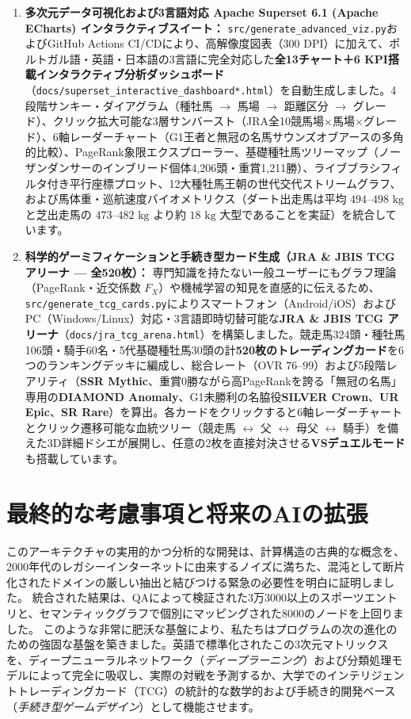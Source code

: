 \documentclass[12pt,a4paper]{article}
\begin{document}
\begin{enumerate}
    \item \textbf{多次元データ可視化および3言語対応 Apache Superset 6.1 (Apache ECharts) インタラクティブスイート：} \texttt{src/generate\_advanced\_viz.py}およびGitHub Actions CI/CDにより、高解像度図表（300 DPI）に加えて、ポルトガル語・英語・日本語の3言語に完全対応した\textbf{全13チャート＋6 KPI搭載インタラクティブ分析ダッシュボード}（\texttt{docs/superset\_interactive\_dashboard*.html}）を自動生成しました。4段階サンキー・ダイアグラム（種牡馬 $\to$ 馬場 $\to$ 距離区分 $\to$ グレード）、クリック拡大可能な3層サンバースト（JRA全10競馬場×馬場×グレード）、6軸レーダーチャート（G1王者と無冠の名馬サウンズオブアースの多角的比較）、PageRank象限エクスプローラー、基礎種牡馬ツリーマップ（ノーザンダンサーのインブリード個体4,206頭・重賞1,211勝）、ライブブラシフィルタ付き平行座標プロット、12大種牡馬王朝の世代交代ストリームグラフ、および馬体重・巡航速度バイオメトリクス（ダート出走馬は平均 $494\text{--}498\text{ kg}$ と芝出走馬の $473\text{--}482\text{ kg}$ より約 $18\text{ kg}$ 大型であることを実証）を統合しています。
    \item \textbf{科学的ゲーミフィケーションと手続き型カード生成（JRA \& JBIS TCG アリーナ — 全520枚）：} 専門知識を持たない一般ユーザーにもグラフ理論（PageRank・近交係数 $F_X$）や機械学習の知見を直感的に伝えるため、\texttt{src/generate\_tcg\_cards.py}によりスマートフォン（Android/iOS）およびPC（Windows/Linux）対応・3言語即時切替可能な\textbf{JRA \& JBIS TCG アリーナ}（\texttt{docs/jra\_tcg\_arena.html}）を構築しました。競走馬324頭・種牡馬106頭・騎手60名・5代基礎種牡馬30頭の計\textbf{520枚のトレーディングカード}を6つのランキングデッキに編成し、総合レート（OVR $76\text{--}99$）および5段階レアリティ（\textbf{SSR Mythic}、重賞0勝ながら高PageRankを誇る「無冠の名馬」専用の\textbf{DIAMOND Anomaly}、G1未勝利の名脇役\textbf{SILVER Crown}、\textbf{UR Epic}、\textbf{SR Rare}）を算出。各カードをクリックすると6軸レーダーチャートとクリック遷移可能な血統ツリー（競走馬 $\leftrightarrow$ 父 $\leftrightarrow$ 母父 $\leftrightarrow$ 騎手）を備えた3D詳細ドシエが展開し、任意の2枚を直接対決させる\textbf{VSデュエルモード}も搭載しています。
\end{enumerate}

\section{最終的な考慮事項と将来のAIの拡張}
このアーキテクチャの実用的かつ分析的な開発は、計算構造の古典的な概念を、2000年代のレガシーインターネットに由来するノイズに満ちた、混沌として断片化されたドメインの厳しい抽出と結びつける緊急の必要性を明白に証明しました。
統合された結果は、QAによって検証された3万3000以上のスポーツエントリと、セマンティックグラフで個別にマッピングされた8000のノードを上回りました。
このような非常に肥沃な基盤により、私たちはプログラムの次の進化のための強固な基盤を築きました。英語で標準化されたこの3次元マトリックスを、ディープニューラルネットワーク（\textit{ディープラーニング}）および分類処理モデルによって完全に吸収し、実際の対戦を予測するか、大学でのインテリジェントトレーディングカード（TCG）の統計的な数学的および手続き的開発ベース（\textit{手続き型ゲームデザイン}）として機能させます。
\end{document}
